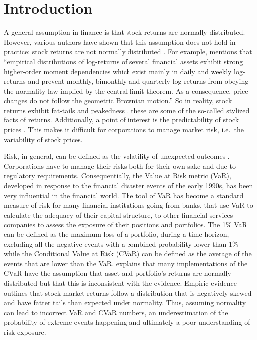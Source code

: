 \documentclass[a4paper, nobind]{templates/ociamthesis}
\begin{document}
\hypertarget{introduction}{%
\chapter*{Introduction}\label{introduction}}

\adjustmtc
{}

\noindent A general assumption in finance is that stock returns are normally distributed. However, various authors have shown that this assumption does not hold in practice: stock returns are not normally distributed \autocites[Among which][]{theodossiou2000,subbotin1923,theodossiou2015}. For example, \textcite{theodossiou2000} mentions that ``empirical distributions of log-returns of several financial assets exhibit strong higher-order moment dependencies which exist mainly in daily and weekly log-returns and prevent monthly, bimonthly and quarterly log-returns from obeying the normality law implied by the central limit theorem. As a consequence, price changes do not follow the geometric Brownian motion.'' So in reality, stock returns exhibit fat-tails and peakedness \autocite{Officer1972}, these are some of the so-called stylized facts of returns. Additionally, a point of interest is the predictability of stock prices \autocite{fama1965,Fama1970,welch2008}. This makes it difficult for corporations to manage market risk, i.e.~the variability of stock prices. ~

Risk, in general, can be defined as the volatility of unexpected outcomes \autocite{jorion2007}. Corporations have to manage their risks both for their own sake and due to regulatory requirements. Consequentially, the Value at Risk metric (VaR), developed in response to the financial disaster events of the early 1990s, has been very influential in the financial world. The tool of VaR has become a standard measure of risk for many financial institutions going from banks, that use VaR to calculate the adequacy of their capital structure, to other financial services companies to assess the exposure of their positions and portfolios. The 1\% VaR can be defined as the maximum loss of a portfolio, during a time horizon, excluding all the negative events with a combined probability lower than 1\% while the Conditional Value at Risk (CVaR) can be defined as the average of the events that are lower than the VaR. \textcite{bali2008} explains that many implementations of the CVaR have the assumption that asset and portfolio's returns are normally distributed but that this is inconsistent with the evidence. Empiric evidence outlines that stock market returns follow a distribution that is negatively skewed and have fatter tails than expected under normality. Thus, assuming normality can lead to incorrect VaR and CVaR numbers, an underestimation of the probability of extreme events happening and ultimately a poor understanding of risk exposure.
\end{document}
